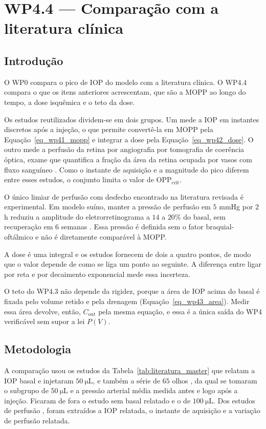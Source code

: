 \section{WP4.4 --- Comparação com a literatura clínica}
\label{sec_wp44}

\subsection{Introdução}

O WP0 compara o pico de IOP do modelo com a literatura clínica. O WP4.4 compara o que os itens anteriores acrescentam, que são a MOPP ao longo do tempo, a dose isquêmica e o teto da dose.

Os estudos reutilizados dividem-se em dois grupos. Um mede a IOP em instantes discretos após a injeção, o que permite convertê-la em MOPP pela Equação~\ref{eq_wp41_mopp} e integrar a dose pela Equação~\ref{eq_wp42_dose}. O outro mede a perfusão da retina por angiografia por tomografia de coerência óptica, exame que quantifica a fração da área da retina ocupada por vasos com fluxo sanguíneo \citep{papazoglou2026}. Como o instante de aquisição e a magnitude do pico diferem entre esses estudos, o conjunto limita o valor de $\mathrm{OPP}_{\text{crit}}$.

O único limiar de perfusão com desfecho encontrado na literatura revisada é experimental. Em modelo suíno, manter a pressão de perfusão em $5$ mmHg por $2$ h reduziu a amplitude do eletrorretinograma a $14$ a $20\%$ do basal, sem recuperação em $6$ semanas \citep{kyhn2009}. Essa pressão é definida sem o fator braquial-oftálmico e não é diretamente comparável à MOPP.

A dose é uma integral e os estudos fornecem de dois a quatro pontos, de modo que o valor depende de como se liga um ponto ao seguinte. A diferença entre ligar por reta e por decaimento exponencial mede essa incerteza.

O teto do WP4.3 não depende da rigidez, porque a área de IOP acima do basal é fixada pelo volume retido e pela drenagem (Equação~\ref{eq_wp43_area}). Medir essa área devolve, então, $C_{\text{out}}$ pela mesma equação, e essa é a única saída do WP4 verificável sem supor a lei $P(V)$.

\subsection{Metodologia}

A comparação usou os estudos da Tabela~\ref{tab:literatura_master} que relatam a IOP basal e injetaram $\SI{50}{\micro\liter}$, e também a série de $65$ olhos \citep{lee2016}, da qual se tomaram o subgrupo de $\SI{50}{\micro\liter}$ e a pressão arterial média medida antes e logo após a injeção. Ficaram de fora o estudo sem basal relatado e o de $\SI{100}{\micro\liter}$. Dos estudos de perfusão \citep{barash2020,arumuganathan2021,papazoglou2026}, foram extraídos a IOP relatada, o instante de aquisição e a variação de perfusão relatada.

